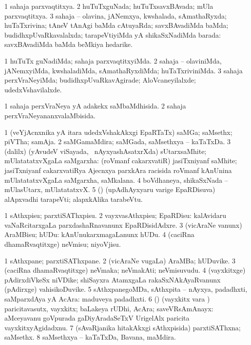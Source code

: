 \bentry
{}
\gl{\gu}
\bmng
\bnum
\num{1} sahaja parxvaqtitxya. 
\num{2} huTuTxguNada; huTuTxsavxBAvada; mUla parxvaqtitxya. 
\num{3} sahaja -- olavina, jANemxya, kwshalada, sAmathaRyxda; huTaTxrivina; tAneV tAnAgi baMda cAtuyaRda; savxBAvadiMda baMda; budidhxpUvaRkavalalxda; tarapeVtiyiMda yA shikaSxNadiMda barada:  savxBAvadiMda baMda beMkiya hedarike. 
\enum
\emng
\eentry

\bentry
{}
\gl{\kirxvi}
\bmng
\bnum
\num{1} huTuTx guNadiMda; sahaja parxvaqtitxyiMda. 
\num{2} sahaja -- olaviniMda, jANemxyiMda, kwshaladiMda, sAmathaRyxdiMda; huTaTxriviniMda. 
\num{3} sahaja perxVraNeyiMda; budidhxpUvaRkavAgirade; AloVcaneyilalxde; udedxVshavilalxde. 
\enum
\emng
\eentry

\bentry
{}
\gl{\gu}
\bmng
\bnum
\num{1} sahaja perxVraNeya yA adakekx saMbaMdhisida. 
\num{2} sahaja perxVraNeyananxvalaMbisida. 
\enum
\emng
\eentry

\bentry
{}
\gl{\nA}
\bmng
\bnum
\num{1} (veYjAcnxnika yA itara udedxVshakAkxgi EpaRTaTx) saMGa; saMsethx; piVTha; samAja. 
\num{2} saMGamaMdira; saMGada, saMsethxya -- kaTaTxDa. 
\num{3} (\bava dalilx) (yAvudeV viSayada, \kanmu\ nAyxyashAsatxrXda) sUtarxsaMhite; mUlatatatxvXgaLa saMgarxha:  (roVmanf cakarxvatiR) jasiTxniyanf saMhite; jasiTxniyanf cakarxvatiRya Ajecnxya parxkAra racisida roVmanf kAnUnina mUlatatatxvXgaLa saMgarxha, saMkalana. 
\num{4} boVdhaneya, shikaSxNada -- mUlasUtarx, mUlatatatxvX. 
\num{5} (\ame) (upAdhAyxyaru \mo varige EpaRDisuva) alApxvadhi tarapeVti; alapxkAlika tarabeVtu. 
\enum
\emng
\eentry

\bentry
{}
\gl{\sakirx}
\bmng
\bnum
\num{1} sAthxpisu; parxtiSAThxpisu. 
\num{2} vayxvasAthxpisu; EpaRDisu:  kalAvidaru vaNaRcitarxgaLa parxdashaRnavanunx EpaRDisidAdxre. 
\num{3} (vicAraNe \mo vanunx) AraMBisu; hUDu:  kAnUnukarxmagaLanunx hUDu. 
\num{4} (caciRna dhamaRvaqtitxge) neVmisu; niyoVjisu. 
\enum
\emng
\eentry

\bentry
{}
\gl{\nA}
\bmng
\bnum
\num{1} sAthxpane; parxtiSAThxpane. 
\num{2} (vicAraNe \mo vugaLa) AraMBa; hUDuvike. 
\num{3} (caciRna dhamaRvaqtitxge) neVmaka; neVmakAti; neVmisuvudu. 
\num{4} (vayxkitxge) pAdirxdiVkeSx niVDike; shiSayxra AtamxgaLa rakaSxNAkAyaRvanunx (pAdirxge) vahisikoDuvike. 
\num{5} sAthxpanegoMDa, sAthxpita -- nAyxya, padadhxti, saMparxdAya yA AcAra:  maduveya padadhxti. 
\num{6} (\AmA) (vayxkitx \mo vara \vi) paricitavasutx, vayxkitx; baLakeya rUDhi, AcAra; saveVRsAmAnayx:  aMceyavanu goVpurada gaDiyAradaSeTxV UrigelAlx paricita vayxkitxyAgidadxnu. 
\num{7} (sAvaRjanika hitakAkxgi sAthxpisida) parxtiSAThxna; saMsethx. 
\num{8} saMsethxya -- kaTaTxDa, Bavana, maMdira. 
\enum
\emng
\eentry


